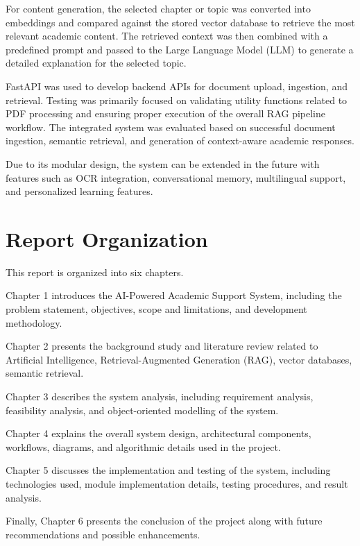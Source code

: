 For content generation, the selected chapter or topic was converted into embeddings and compared against the stored vector database to retrieve the most relevant academic content. The retrieved context was then combined with a predefined prompt and passed to the Large Language Model (LLM) to generate a detailed explanation for the selected topic. \par

FastAPI was used to develop backend APIs for document upload, ingestion, and retrieval. Testing was primarily focused on validating utility functions related to PDF processing and ensuring proper execution of the overall RAG pipeline workflow. The integrated system was evaluated based on successful document ingestion, semantic retrieval, and generation of context-aware academic responses. \par 

Due to its modular design, the system can be extended in the future with features such as OCR integration, conversational memory, multilingual support, and personalized learning features. \par

\section{Report Organization}

This report is organized into six chapters. \par

Chapter 1 introduces the AI-Powered Academic Support System, including the problem statement, objectives, scope and limitations, and development methodology. \par

Chapter 2 presents the background study and literature review related to Artificial Intelligence, Retrieval-Augmented Generation (RAG), vector databases, semantic retrieval. \par 

Chapter 3 describes the system analysis, including requirement analysis, feasibility analysis, and object-oriented modelling of the system. \par

Chapter 4 explains the overall system design, architectural components, workflows, diagrams, and algorithmic details used in the project. \par

Chapter 5 discusses the implementation and testing of the system, including technologies used, module implementation details, testing procedures, and result analysis. \par

Finally, Chapter 6 presents the conclusion of the project along with future recommendations and possible enhancements. \par